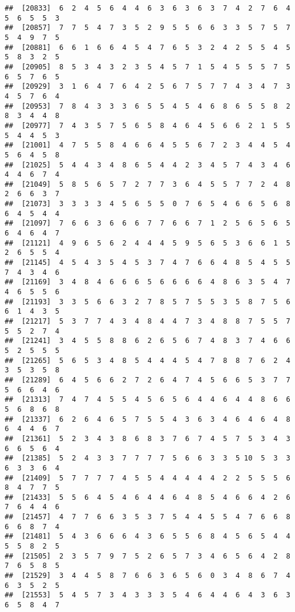 \documentclass[
]{book}
\begin{document}
\begin{verbatim}
##  [20833]  6  2  4  5  6  4  4  6  3  6  3  6  3  7  4  2  7  6  4  5  6  5  5  3
##  [20857]  7  7  5  4  7  3  5  2  9  5  5  6  6  3  3  5  7  5  7  5  4  9  7  5
##  [20881]  6  6  1  6  6  4  5  4  7  6  5  3  2  4  2  5  5  4  5  5  8  3  2  5
##  [20905]  8  5  3  4  3  2  3  5  4  5  7  1  5  4  5  5  5  7  5  6  5  7  6  5
##  [20929]  3  1  6  4  7  6  4  2  5  6  7  5  7  7  4  3  4  7  3  4  5  7  6  4
##  [20953]  7  8  4  3  3  3  6  5  5  4  5  4  6  8  6  5  5  8  2  8  3  4  4  8
##  [20977]  7  4  3  5  7  5  6  5  8  4  6  4  5  6  6  2  1  5  5  5  4  4  5  3
##  [21001]  4  7  5  5  8  4  6  6  4  5  5  6  7  2  3  4  4  5  4  5  6  4  5  8
##  [21025]  5  4  4  3  4  8  6  5  4  4  2  3  4  5  7  4  3  4  6  4  4  6  7  4
##  [21049]  5  8  5  6  5  7  2  7  7  3  6  4  5  5  7  7  2  4  8  2  6  6  3  7
##  [21073]  3  3  3  3  4  5  6  5  5  0  7  6  5  4  6  6  5  6  8  6  4  5  4  4
##  [21097]  7  6  6  3  6  6  6  7  7  6  6  7  1  2  5  6  5  6  5  6  4  6  4  7
##  [21121]  4  9  6  5  6  2  4  4  4  5  9  5  6  5  3  6  6  1  5  2  6  5  5  4
##  [21145]  4  5  4  3  5  4  5  3  7  4  7  6  6  4  8  5  4  5  5  7  4  3  4  6
##  [21169]  3  4  8  4  6  6  6  5  6  6  6  6  4  8  6  3  5  4  7  4  6  5  5  6
##  [21193]  3  3  5  6  6  3  2  7  8  5  7  5  5  3  5  8  7  5  6  6  1  4  3  5
##  [21217]  5  3  7  7  4  3  4  8  4  4  7  3  4  8  8  7  5  5  7  5  5  2  7  4
##  [21241]  3  4  5  5  8  8  6  2  6  5  6  7  4  8  3  7  4  6  6  5  2  5  5  5
##  [21265]  5  6  5  3  4  8  5  4  4  4  5  4  7  8  8  7  6  2  4  3  5  3  5  8
##  [21289]  6  4  5  6  6  2  7  2  6  4  7  4  5  6  6  5  3  7  7  5  6  6  4  6
##  [21313]  7  4  7  4  5  5  4  5  6  5  6  4  4  6  4  4  8  6  6  5  6  8  6  8
##  [21337]  6  2  6  4  6  5  7  5  5  4  3  6  3  4  6  4  6  4  8  6  4  4  6  7
##  [21361]  5  2  3  4  3  8  6  8  3  7  6  7  4  5  7  5  3  4  3  6  6  5  6  4
##  [21385]  5  2  4  3  3  7  7  7  7  5  6  6  3  3  5 10  5  3  3  6  3  3  6  4
##  [21409]  5  7  7  7  7  4  5  5  4  4  4  4  4  2  2  5  5  5  6  8  4  7  7  5
##  [21433]  5  5  6  4  5  4  6  4  4  6  4  8  5  4  6  6  4  2  6  7  6  4  4  6
##  [21457]  4  7  7  6  6  3  5  3  7  5  4  4  5  5  4  7  6  6  8  6  6  8  7  4
##  [21481]  5  4  3  6  6  6  4  3  6  5  5  6  8  4  5  6  5  4  4  5  5  8  2  5
##  [21505]  2  3  5  7  9  7  5  2  6  5  7  3  4  6  5  6  4  2  8  7  6  5  8  5
##  [21529]  3  4  4  5  8  7  6  6  3  6  5  6  0  3  4  8  6  7  4  6  3  5  2  5
##  [21553]  5  4  5  7  3  4  3  3  3  5  4  6  4  4  6  4  3  6  3  6  5  8  4  7

\end{verbatim}
\end{document}
